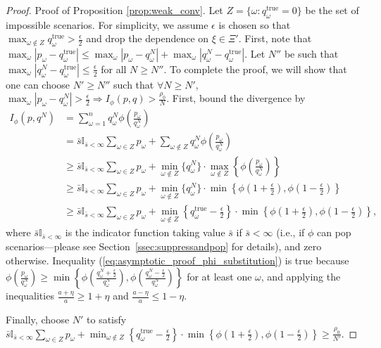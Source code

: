 \documentclass[opre,nonblindrev]{informs3} %
\newcommand{\qtrue}{q^{\text{true}}}
\begin{document}
\begin{proof}{\sc Proof of Proposition \ref{prop:weak_conv}.}
	Let $Z = \{\omega : \qtrue_\omega = 0\}$ be the set of impossible scenarios.
	For simplicity, we assume $\epsilon$ is chosen so that $\max_{\omega \notin Z} \qtrue_\omega > \frac{\epsilon}{2}$ and drop the dependence on $\xi \in \Xi'$.	
	First, note that $\max_\omega |p_\omega - \qtrue_\omega| \leq \max_\omega |p_\omega - q^N_\omega| + \max_\omega |q^N_\omega - \qtrue_\omega|$.
	Let $N''$ be such that $\max_\omega |q^N_\omega - \qtrue_\omega| \leq \frac{\epsilon}{2}$ for all $N \geq N''$.
	To complete the proof, we will show that one can choose $N' \geq N''$ such that $\forall N \geq N'$, $\max_\omega |p_\omega - q^N_\omega| > \frac{\epsilon}{2} \Rightarrow I_\phi(p,q) > \frac{\rho_0}{N}$.
	First, bound the divergence by
	\begin{align}
		I_{\phi}(p,q^N) & = \sum_{\omega=1}^n q^N_\omega \phi\left( \frac{p_\omega}{q^N_\omega} \right) \nonumber \\
		& = \bar{s} \mathbb{I}_{\bar{s} < \infty} \sum_{\omega \in Z} p_\omega + \sum_{\omega \notin Z} q^N_\omega \phi\left( \frac{p_\omega}{q^N_\omega} \right) \nonumber \\
		& \geq \bar{s} \mathbb{I}_{\bar{s} < \infty} \sum_{\omega \in Z} p_\omega + \min_{\omega \notin Z} \{q^N_\omega\} \cdot \max_{\omega \notin Z} \left\{ \phi \left( \frac{p_\omega}{q^N_\omega} \right) \right\} \nonumber \\
		& \geq \bar{s} \mathbb{I}_{\bar{s} < \infty} \sum_{\omega \in Z} p_\omega  + \min_{\omega \notin Z} \{q^N_\omega\} \cdot \min\left\{ \phi\left(1+\frac{\epsilon}{2}\right), \phi\left(1-\frac{\epsilon}{2}\right) \right\} \label{eq:asymptotic_proof_phi_substitution} \\
		& \geq \bar{s} \mathbb{I}_{\bar{s} < \infty} \sum_{\omega \in Z} p_\omega + \min_{\omega \notin Z} \left\{ \qtrue_\omega - \frac{\epsilon}{2} \right\} \cdot \min\left\{ \phi\left(1+\frac{\epsilon}{2}\right), \phi\left(1-\frac{\epsilon}{2}\right) \right\} \nonumber,
	\end{align}
	where $\bar{s}\mathbb{I}_{\bar{s} < \infty}$ is the indicator function taking value $\bar{s}$ if $\bar{s} < \infty$ (i.e., if $\phi$ can pop scenarios---please see Section~\ref{ssec:suppressandpop} for details), and zero otherwise.	
	Inequality (\ref{eq:asymptotic_proof_phi_substitution}) is true because $\phi \left( \frac{p_\omega}{q^N_\omega} \right) \geq \min\left\{ \phi\left( \frac{q^N_\omega+\tfrac{\epsilon}{2}}{q^N_\omega} \right), \phi\left( \frac{q^N_\omega-\tfrac{\epsilon}{2}}{q^N_\omega} \right) \right\}$ for at least one $\omega$, and applying the inequalities $\frac{a+\eta}{a} \geq 1 + \eta$ and $\frac{a-\eta}{a} \leq 1-\eta$.
	
	Finally, choose $N'$ to satisfy $\bar{s} \mathbb{I}_{\bar{s} < \infty} \sum_{\omega \in Z} p_\omega + \min_{\omega \notin Z} \left\{ \qtrue_\omega - \frac{\epsilon}{2} \right\} \cdot \min\left\{ \phi\left(1+\frac{\epsilon}{2}\right), \phi\left(1-\frac{\epsilon}{2}\right) \right\} \geq \frac{\rho_0}{N'}$.
	\Halmos
\end{proof}
\end{document}
